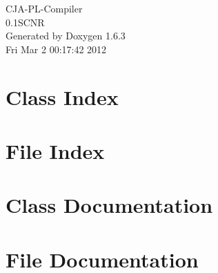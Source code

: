 \documentclass[a4paper]{book}
\begin{document}
\hypersetup{pageanchor=false}
\begin{titlepage}
\vspace*{7cm}
\begin{center}
{\Large CJA-\/PL-\/Compiler \\[1ex]\large 0.1SCNR }\\
\vspace*{1cm}
{\large Generated by Doxygen 1.6.3}\\
\vspace*{0.5cm}
{\small Fri Mar 2 00:17:42 2012}\\
\end{center}
\end{titlepage}
\clearemptydoublepage
{}
\tableofcontents
\clearemptydoublepage
{}
\hypersetup{pageanchor=true}
\chapter{Class Index}

\chapter{File Index}

\chapter{Class Documentation}







\chapter{File Documentation}















\printindex
\end{document}
